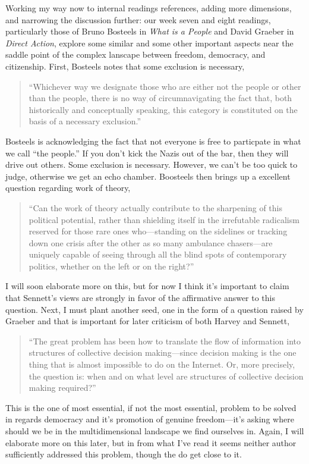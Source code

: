 \documentclass[12pt,a4paper]{article}
\begin{document}
Working my way now to internal readings references, adding more dimensions, and narrowing the discussion further: our week seven and eight readings, particularly those of Bruno Bosteels in \textit{What is a People} and David Graeber in \textit{Direct Action}, explore some similar and some other important aspects near the saddle point of the complex lanscape between freedom, democracy, and citizenship. First, Bosteels notes that some exclusion is necessary, 
\begin{quote}\color{G-Moon}
   ``Whichever way we designate those who are either not the people or other than the people, there is no way of circumnavigating the fact that, both historically and conceptually speaking, this category is constituted on the basis of a necessary exclusion.''~\cite{people}
\end{quote}
Bosteels is acknowledging the fact that not everyone is free to particpate in what we call ``the people.'' If you don't kick the Nazis out of the bar, then they will drive out others. Some exclusion is necessary. However, we can't be too quick to judge, otherwise we get an echo chamber. Boosteels then brings up a excellent question regarding work of theory, 
\begin{quote}\color{G-Moon}
   ``Can the work of theory actually contribute to the sharpening of this political potential, rather than shielding itself in the irrefutable radicalism reserved for those rare ones who—standing on the sidelines or tracking down one crisis after the other as so many ambulance chasers—are uniquely capable of seeing through all the blind spots of contemporary politics, whether on the left or on the right?''~\cite{people}
\end{quote}
I will soon elaborate more on this, but for now I think it's important to claim that Sennett's views are strongly in favor of the affirmative answer to this question. Next, I must plant another seed, one in the form of a question raised by Graeber and that is important for later criticism of both Harvey and Sennett,
\begin{quote}\color{G-Moon}
   ``The great problem has been how to translate the flow of information into structures of collective decision making—since decision making is the one thing that is almost impossible to do on the Internet. Or, more precisely, the question is: when and on what level are structures of collective decision making required?''~\cite{direct}
\end{quote}
This is the one of most essential, if not the most essential, problem to be solved in regards democracy and it's promotion of genuine freedom---it's asking where should we be in the multidimensional landscape we find ourselves in. Again, I will elaborate more on this later, but in from what I've read it seems neither author sufficiently addressed this problem, though the do get close to it.
\end{document}
